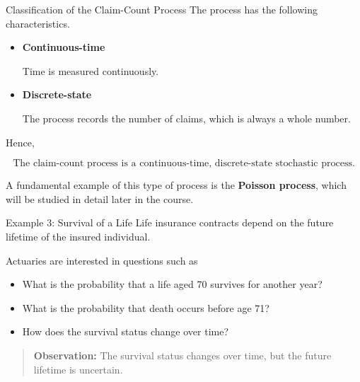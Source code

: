 \documentclass[
  ignorenonframetext,
  aspectratio=169,
]{beamer}
\providecommand{\tightlist}{%
  \setlength{\itemsep}{0pt}\setlength{\parskip}{0pt}}
\begin{document}
\begin{frame}{Classification of the Claim-Count Process}
\protect{}\label{classification-of-the-claim-count-process}
The process has the following characteristics.

\begin{itemize}
\item
  \textbf{Continuous-time}

  Time is measured continuously.
\item
  \textbf{Discrete-state}

  The process records the number of claims, which is always a whole
  number.
\end{itemize}

Hence,

\[
\boxed{\text{The claim-count process is a continuous-time, discrete-state stochastic process.}}
\]

A fundamental example of this type of process is the \textbf{Poisson
process}, which will be studied in detail later in the course.
\end{frame}

\begin{frame}{Example 3: Survival of a Life}
\protect{}\label{example-3-survival-of-a-life}
Life insurance contracts depend on the future lifetime of the insured
individual.

Actuaries are interested in questions such as

\begin{itemize}
\tightlist
\item
  What is the probability that a life aged 70 survives for another year?
\item
  What is the probability that death occurs before age 71?
\item
  How does the survival status change over time?
\end{itemize}

\begin{quote}
\textbf{Observation:} The survival status changes over time, but the
future lifetime is uncertain.
\end{quote}
\end{frame}
\end{document}
